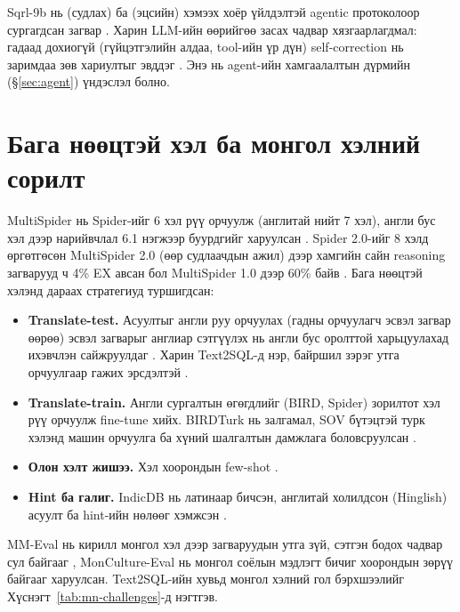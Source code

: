 Sqrl-9b нь  (судлах) ба  (эцсийн) хэмээх хоёр үйлдэлтэй agentic протоколоор сургагдсан
загвар \cite{feyn_2026_sqrl}. Харин LLM-ийн өөрийгөө засах чадвар хязгаарлагдмал: гадаад дохиогүй (гүйцэтгэлийн
алдаа, tool-ийн үр дүн) self-correction нь заримдаа зөв хариултыг эвддэг \cite{huang_2024_self_correct}. Энэ нь agent-ийн
хамгаалалтын дүрмийн (§\ref{sec:agent}) үндэслэл болно.

\section{Бага нөөцтэй хэл ба монгол хэлний сорилт}
\label{sec:lowres}

MultiSpider нь Spider-ийг 6 хэл рүү орчуулж (англитай нийт 7 хэл), англи бус хэл дээр нарийвчлал 6.1 нэгжээр
буурдгийг харуулсан \cite{dou_2023_multispider}. Spider 2.0-ийг 8 хэлд өргөтгөсөн MultiSpider 2.0 (өөр судлаачдын
ажил) дээр хамгийн сайн reasoning загварууд ч 4\% EX авсан бол MultiSpider 1.0 дээр 60\% байв
\cite{pham_2026_multispider2}. Бага нөөцтэй хэлэнд дараах стратегиуд туршигдсан:
\begin{itemize}
  \item \textbf{Translate-test.} Асуултыг англи руу орчуулах (гадны орчуулагч эсвэл загвар өөрөө) эсвэл загварыг
        англиар сэтгүүлэх нь англи бус оролттой харьцуулахад ихэвчлэн сайжруулдаг
        \cite{etxaniz_2024_self_translate, huang_2023_xlt}. Харин Text2SQL-д нэр, байршил зэрэг утга орчуулгаар гажих
        эрсдэлтэй \cite{dawar_2026_indicdb}.
  \item \textbf{Translate-train.} Англи сургалтын өгөгдлийг (BIRD, Spider) зорилтот хэл рүү орчуулж fine-tune хийх.
        BIRDTurk нь залгамал, SOV бүтэцтэй турк хэлэнд машин орчуулга ба хүний шалгалтын дамжлага боловсруулсан
        \cite{aktas_2026_birdturk}.
  \item \textbf{Олон хэлт жишээ.} Хэл хоорондын few-shot \cite{shi_2022_xricl}.
  \item \textbf{Hint ба галиг.} IndicDB нь латинаар бичсэн, англитай холилдсон (Hinglish) асуулт ба hint-ийн нөлөөг хэмжсэн
        \cite{dawar_2026_indicdb}.
\end{itemize}

MM-Eval нь кирилл монгол хэл дээр загваруудын утга зүй, сэтгэн бодох чадвар сул байгааг \cite{zhang_2024_mm_eval},
MonCulture-Eval нь монгол соёлын мэдлэгт бичиг хоорондын зөрүү байгааг \cite{minggad_2026_monculture_eval} харуулсан. Text2SQL-ийн
хувьд монгол хэлний гол бэрхшээлийг Хүснэгт~\ref{tab:mn-challenges}-д нэгтгэв.

